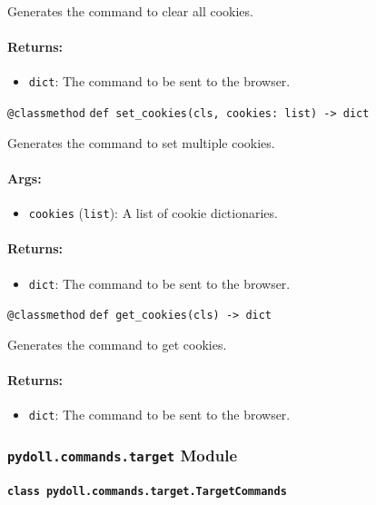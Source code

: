 \documentclass{article}
\begin{document}
\noindent Generates the command to clear all cookies.

\paragraph{Returns:}
\begin{itemize}
    \item \texttt{dict}: The command to be sent to the browser.
\end{itemize}

\noindent\texttt{@classmethod}
\noindent\texttt{def set\_cookies(cls, cookies: list) -> dict}

\noindent Generates the command to set multiple cookies.

\paragraph{Args:}
\begin{itemize}
    \item \texttt{cookies} (\texttt{list}): A list of cookie dictionaries.
\end{itemize}

\paragraph{Returns:}
\begin{itemize}
    \item \texttt{dict}: The command to be sent to the browser.
\end{itemize}

\noindent\texttt{@classmethod}
\noindent\texttt{def get\_cookies(cls) -> dict}

\noindent Generates the command to get cookies.

\paragraph{Returns:}
\begin{itemize}
    \item \texttt{dict}: The command to be sent to the browser.
\end{itemize}

\subsubsection*{\texttt{pydoll.commands.target} Module}

\paragraph*{\texttt{class pydoll.commands.target.TargetCommands}}
\end{document}
